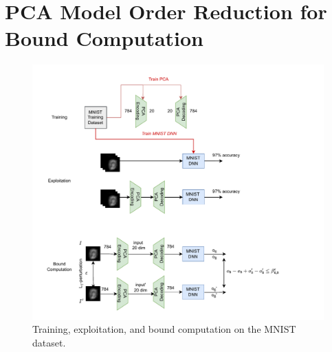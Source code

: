 \section{PCA Model Order Reduction for Bound Computation}


\begin{figure}[h!]
    \centering
    \includegraphics[scale=0.9]{MNIST.pdf} \hspace{1.5cm}
    \caption{Training, exploitation, and bound computation on the MNIST dataset.}
    \label{fig.MNIST}
\end{figure}	

